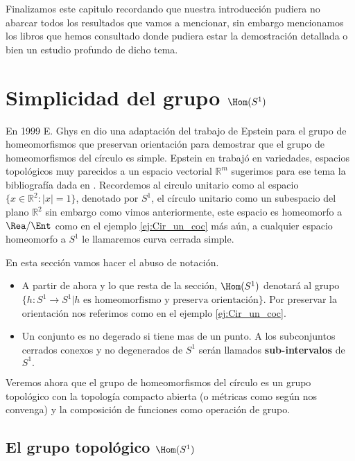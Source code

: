 Finalizamos este capitulo recordando que nuestra introducción pudiera no abarcar todos los resultados que vamos a mencionar, sin embargo mencionamos los libros que hemos consultado donde pudiera  estar la demostración detallada  o bien un estudio profundo de dicho tema.


\chapter*{Simplicidad del grupo $\Hom(S^1)$}

 En 1999 E. Ghys en \cite{ghys} dio una adaptación del trabajo de Epstein \cite{epst} para el grupo de homeomorfismos que preservan orientación para demostrar que el grupo de homeomorfismos del círculo es simple. Epstein en \cite{epst} trabajó en variedades, espacios topológicos muy parecidos a un espacio vectorial $\mathbb{R}^m$ sugerimos para ese tema la bibliografía dada en \cite{palmas}.  Recordemos al circulo unitario como al espacio $\{x \in\mathbb{R}^2:|x|=1 \}$, denotado por $S^1$, el círculo unitario como un subespacio del plano $\mathbb{R}^2$ sin embargo como vimos anteriormente, este espacio es homeomorfo a $\Rea / \Ent$ como en el ejemplo \ref{ej:Cir_un_coc} más aún, a cualquier espacio homeomorfo a $S^1$ le llamaremos curva cerrada simple.
 
\begin{cn}
En esta sección vamos hacer el abuso de notación.
	\begin{itemize}
	\item A partir de ahora y lo que resta de la sección, $\Hom(S^1)$ denotará al grupo $\{h: S^1 \to S^1 | h \text{ es homeomorfismo y preserva orientación} \}$. Por preservar la orientación nos referimos como en el ejemplo \ref{ej:Cir_un_coc}.
	\item Un conjunto es no degerado si tiene mas de un punto. A los subconjuntos cerrados conexos y no degenerados de  $S^1$ serán llamados \textbf{sub-intervalos} de $S^1.$ 
	\end{itemize}
\end{cn}

Veremos ahora que el grupo de homeomorfismos del círculo es un grupo topológico con la topología compacto abierta (o métricas como según nos convenga) y la composición de funciones como operación de grupo.

\section*{El grupo topológico $\Hom(S^1)$}

